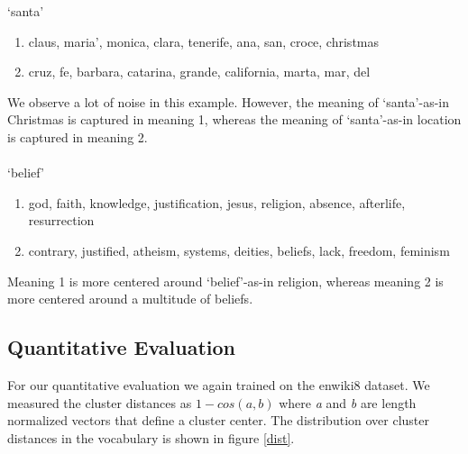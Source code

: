 \documentclass[11pt]{article}
\begin{document}
`santa'
\begin{enumerate}
\item claus, maria', monica, clara, tenerife, ana, san, croce, christmas
\item cruz, fe, barbara, catarina, grande, california, marta, mar, del
\end{enumerate}
We observe a lot of noise in this example. However, the meaning of `santa'-as-in Christmas is captured in meaning 1, whereas the meaning of `santa'-as-in location is captured in meaning 2. \\\\
`belief'
\begin{enumerate}
\item god, faith, knowledge, justification, jesus, religion, absence, afterlife, resurrection
\item contrary, justified, atheism, systems, deities, beliefs, lack, freedom, feminism
\end{enumerate}
Meaning 1 is more centered around `belief'-as-in religion, whereas meaning 2 is more centered around a multitude of beliefs. 

\subsection{Quantitative Evaluation}
\label{qual}
For our quantitative evaluation we again trained on the enwiki8 dataset. We measured the cluster distances as $1-cos(a,b)$ where \textit{a} and \textit{b} are length normalized vectors that define a cluster center. The distribution over cluster distances in the vocabulary is shown in figure \ref{dist}.
\end{document}
